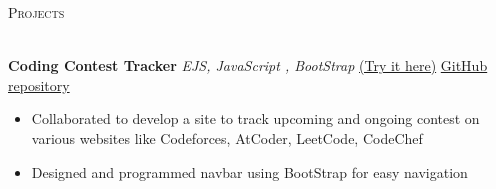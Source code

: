 \documentclass[a4paper]{article}
\newcommand{\lineunder} {
    \vspace*{-8pt} \\
    \hspace*{-18pt} \hrulefill \\
}
\newcommand{\header} [1] {
    {\hspace*{-18pt}\vspace*{6pt} \textsc{#1}}
    \vspace*{-6pt} \lineunder
}
\begin{document}




\header{Projects}
\vspace{1mm}

{\textbf{Coding Contest Tracker}} {\sl EJS, JavaScript , BootStrap} \hfill \href{https://coding-contest-tracker.onrender.com/}{(Try it here)}  \href{https://github.com/sahil19-19/Coding-Contest-Tracker}{GitHub repository}\\
\begin{itemize}
	\item Collaborated to develop a site to track upcoming and ongoing contest on various websites like Codeforces, AtCoder, LeetCode, CodeChef
	\item Designed and programmed navbar using BootStrap for easy navigation
\end{itemize}
\vspace*{1.5mm}
\end{document}
